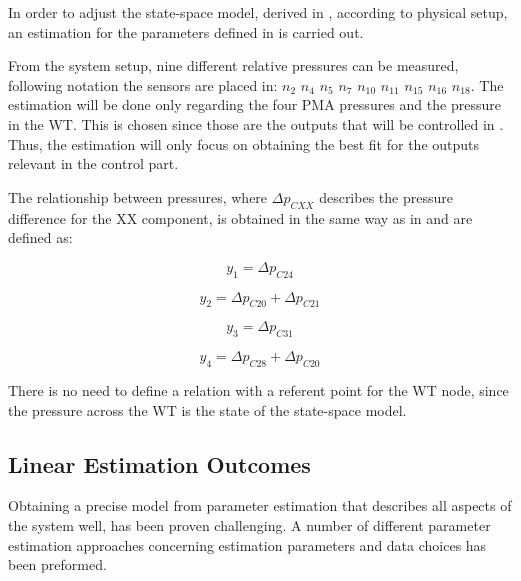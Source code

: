 In order to adjust the state-space model, derived in , according to physical setup, an estimation for the parameters defined in 
is carried out.

From the system setup, nine different relative pressures can be measured, following  notation the sensors are placed in: 
$n_2$ $n_4$ $n_5$ $n_7$ $n_{10}$ $n_{11}$ $n_{15}$ $n_{16}$ $n_{18}$. The estimation will be done only regarding the four PMA pressures and the pressure in the WT. This is chosen since those are the outputs that will be controlled in . Thus, the estimation will only focus on obtaining the best fit for the outputs relevant in the control part. 

The relationship between pressures, where $\Delta p_{CXX}$ describes the pressure difference for the XX component, is obtained in the same way as in  and are defined as:

\vspace{4mm}
\begin {equation}
     y_1 = \Delta p_{C24} 
\end{equation}

\vspace{4mm}
\begin {equation}
     y_2 = \Delta p_{C20} + \Delta p_{C21} 
\end{equation}


\vspace{4mm}
\begin {equation}
     y_3 = \Delta p_{C31} 
\end{equation}

\vspace{4mm}
\begin {equation}
     y_4 = \Delta p_{C28} + \Delta p_{C20}  
\end{equation}

There is no need to define a relation with a referent point for the WT node, since the pressure across the WT is the state of the state-space model. 


\subsection{Linear Estimation Outcomes}

Obtaining a precise model from parameter estimation that describes all aspects of the system well, has been proven challenging. A number of different parameter estimation approaches concerning estimation parameters and data choices has been preformed.   

